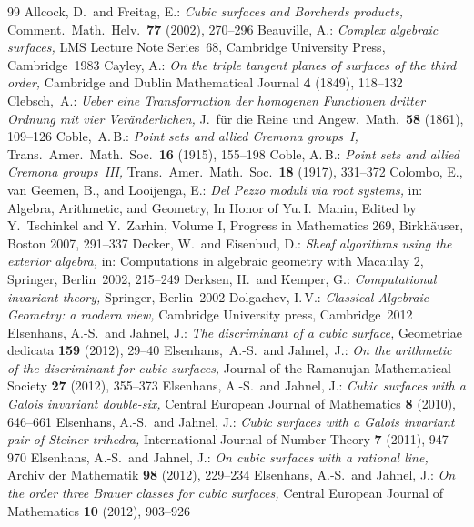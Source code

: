 \documentclass[reqno]{amsart}
\newcommand{\br}{ }
\newcommand{\brr}{, }
\theoremstyle{definition}
\theoremstyle{remark}
\numberwithin{equation}{section}
\begin{document}
\begin{thebibliography}{99}
Allcock, D.\ and Freitag, E.: {\em Cubic surfaces and Borcherds products,} Comment.\ Math.\ Helv.\ {\bf 77}\br(2002)\brr270--296
Beauville, A.: {\em Complex algebraic surfaces,} LMS Lecture Note Series~68, Cambridge University Press, Cambridge~1983
Cayley, A.: {\em On the triple tangent planes of surfaces of the third order,} Cambridge and Dublin Mathematical Journal {\bf 4}\br(1849)\brr118--132
Clebsch,~A.: {\em Ueber eine Transformation der homogenen Functionen dritter Ordnung mit vier Ver\"anderlichen,} J.\ f\"ur die Reine und Angew.\ Math.\ {\bf 58}\br(1861)\brr109--126
Coble,~A.\,B.: {\em Point sets and allied Cremona groups~I,} Trans.\ Amer.\ Math.\ Soc.\ {\bf 16}\br(1915)\brr155--198
Coble, A.\,B.: {\em Point sets and allied Cremona groups~III,}
Trans.\ Amer.\ Math.\ Soc.\ {\bf 18}\br(1917)\brr331--372
Colombo, E., van Geemen, B., and Looijenga, E.: {\em Del Pezzo moduli via root systems,} in: Algebra, Arithmetic, and Geometry, In Honor of Yu.\,I.\ Manin, Edited by Y.~Tschinkel and Y.~Zarhin, Volume I, Progress in Mathematics 269, Birkh\"auser, Boston 2007, 291--337
Decker, W.\ and Eisenbud, D.: {\em Sheaf algorithms using the exterior algebra,} in: Computations in algebraic geometry with Macaulay 2, Springer, Berlin~2002, 215--249
Derksen, H.\ and Kemper, G.: {\em Computational invariant theory,} Springer, Berlin~2002
Dolgachev, I.\,V.: {\em Classical Algebraic Geometry: a modern view,} Cambridge University press, Cambridge~2012
Elsenhans, A.-S.\ and Jahnel, J.: {\em The discriminant of a cubic surface,} Geometriae dedicata {\bf 159}\br(2012)\brr29--40
Elsenhans,~A.-S.\ and Jahnel,~J.: {\em On the arithmetic of the discriminant for cubic surfaces,} Journal of the Ramanujan Mathematical Society {\bf 27}\br(2012)\brr355--373
Elsenhans, A.-S.\ and Jahnel, J.: {\em Cubic surfaces with a Galois invariant double-six,} Central European Journal of Mathematics {\bf 8}\br(2010)\brr646--661
Elsenhans, A.-S.\ and Jahnel, J.: {\em Cubic surfaces with a Galois invariant pair of Steiner trihedra,} International Journal of Number Theory {\bf 7}\br(2011)\brr947--970
Elsenhans, A.-S.\ and Jahnel, J.: {\em On cubic surfaces with a rational line,} Archiv der Mathematik {\bf 98}\br(2012)\brr229--234
Elsenhans, A.-S.\ and Jahnel, J.: {\em On the order three Brauer classes for cubic surfaces,} Central European Journal of Mathematics {\bf 10}\br(2012)\brr903--926

\end{thebibliography}
\end{document}
